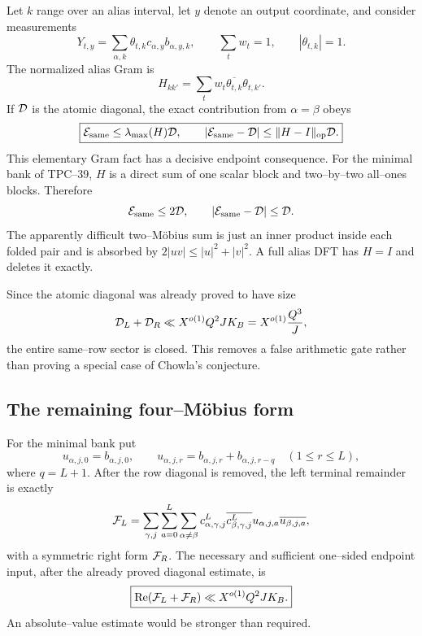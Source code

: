 Let \(k\) range over an alias interval, let \(y\) denote an output
coordinate, and consider measurements
\begin{equation}
 Y_{t,y}=\sum_{\alpha,k}\theta_{t,k}c_{\alpha,y}b_{\alpha,y,k},
 \qquad
 \sum_tw_t=1,
 \qquad |\theta_{t,k}|=1.
 \label{eq:tpc41-intro-measurement}
\end{equation}
The normalized alias Gram is
\begin{equation}
 H_{kk'}=\sum_tw_t\overline{\theta_{t,k}}\theta_{t,k'}.
 \label{eq:tpc41-intro-H}
\end{equation}
If \(\mathcal D\) is the atomic diagonal, the exact contribution from
\(\alpha=\beta\) obeys
\begin{equation}
 \boxed{
 \mathcal E_{\rm same}\le\lambda_{\max}(H)\mathcal D,
 \qquad
 |\mathcal E_{\rm same}-\mathcal D|
 \le\|H-I\|_{\operatorname{op}}\mathcal D.}
 \label{eq:tpc41-intro-general-closure}
\end{equation}
This elementary Gram fact has a decisive endpoint consequence.  For the
minimal bank of TPC--39, \(H\) is a direct sum of one scalar block and
two--by--two all--ones blocks.  Therefore
\begin{equation}
 \mathcal E_{\rm same}\le2\mathcal D,
 \qquad
 |\mathcal E_{\rm same}-\mathcal D|\le\mathcal D.
 \label{eq:tpc41-intro-minimal-closure}
\end{equation}
The apparently difficult two--M\"obius sum is just an inner product inside
each folded pair and is absorbed by \(2|uv|\le|u|^2+|v|^2\).  A full
alias DFT has \(H=I\) and deletes it exactly.

Since the atomic diagonal was already proved to have size
\begin{equation}
 \mathcal D_L+\mathcal D_R
 \ll X^{o(1)}Q^2JK_B
 =X^{o(1)}\frac{Q^3}{J},
 \label{eq:tpc41-intro-diagonal-scale}
\end{equation}
the entire same--row sector is closed.  This removes a false arithmetic
gate rather than proving a special case of Chowla's conjecture.

\subsection{The remaining four--M\"obius form}

For the minimal bank put
\begin{equation}
 u_{\alpha,j,0}=b_{\alpha,j,0},
 \qquad
 u_{\alpha,j,r}=b_{\alpha,j,r}+b_{\alpha,j,r-q}
 \quad(1\le r\le L),
 \label{eq:tpc41-intro-folded-atoms}
\end{equation}
where \(q=L+1\).  After the row diagonal is removed, the left terminal
remainder is exactly
\begin{equation}
 \mathcal F_L
 =\sum_{\gamma,j}\sum_{a=0}^{L}
   \sum_{\alpha\ne\beta}
   c^L_{\alpha,\gamma,j}
   \overline{c^L_{\beta,\gamma,j}}
   u_{\alpha,j,a}\overline{u_{\beta,j,a}},
 \label{eq:tpc41-intro-four-form}
\end{equation}
with a symmetric right form \(\mathcal F_R\).  The necessary and sufficient
one--sided endpoint input, after the already proved diagonal estimate, is
\begin{equation}
 \boxed{
 \operatorname{Re}(\mathcal F_L+\mathcal F_R)
 \ll X^{o(1)}Q^2JK_B.}
 \label{eq:tpc41-intro-true-gate}
\end{equation}
An absolute--value estimate would be stronger than required.

